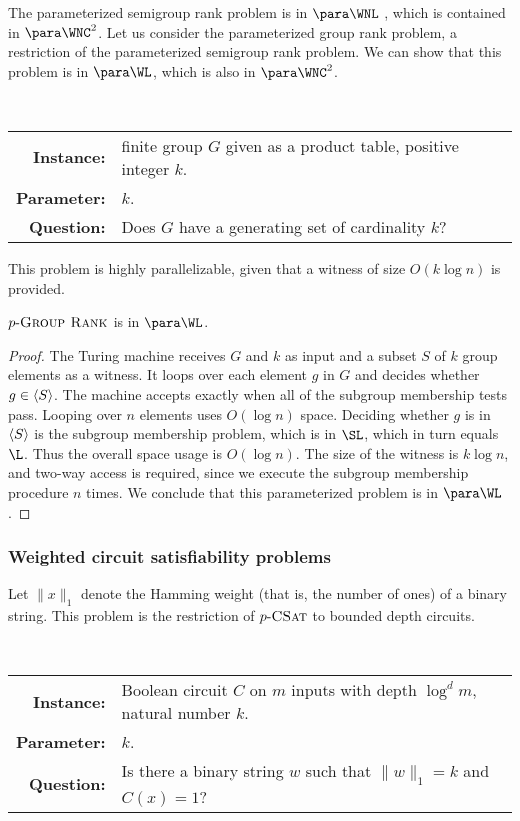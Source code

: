 The parameterized semigroup rank problem is in $\para \WNL$ \autocite[Theorem~3.12]{est15}, which is contained in $\para \WNC^2$.
Let us consider the parameterized group rank problem, a restriction of the parameterized semigroup rank problem.
We can show that this problem is in $\para \WL$, which is also in $\para \WNC^2$.

\begin{definition}[$\pgrouprank$]
  \mbox{} \\
  \begin{tabular}{r p{9.2cm}}
    \textbf{Instance:} & finite group $G$ given as a product table, positive integer $k$. \\
    \textbf{Parameter:} & $k$. \\
    \textbf{Question:} & Does $G$ have a generating set of cardinality $k$?
  \end{tabular}
\end{definition}

This problem is highly parallelizable, given that a witness of size $O(k \log n)$ is provided.

\begin{theorem}\label{thm:pgrouprank}
  $\pgrouprank$ is in $\para \WL$.
\end{theorem}
\begin{proof}
  The Turing machine receives $G$ and $k$ as input and a subset $S$ of $k$ group elements as a witness.
  It loops over each element $g$ in $G$ and decides whether $g \in \langle S\rangle$.
  The machine accepts exactly when all of the subgroup membership tests pass.
  Looping over $n$ elements uses $O(\log n)$ space.
  Deciding whether $g$ is in $\langle S\rangle$ is the subgroup membership problem, which is in $\SL$, which in turn equals $\L$.
  Thus the overall space usage is $O(\log n)$.
  The size of the witness is $k \log n$, and two-way access is required, since we execute the subgroup membership procedure $n$ times.
  We conclude that this parameterized problem is in $\para \WL$.
\end{proof}

\subsubsection{Weighted circuit satisfiability problems}

Let $\|x\|_1$ denote the Hamming weight (that is, the number of ones) of a binary string.
This problem is the restriction of $p \textnormal{-} \textsc{CSat}$ to bounded depth circuits.

\begin{definition}[$\pNCSAT$]
  \mbox{} \\
  \begin{tabular}{r p{9.2cm}}
    \textbf{Instance:} & Boolean circuit $C$ on $m$ inputs with depth $\log^d m$, natural number $k$. \\
    \textbf{Parameter:} & $k$. \\
    \textbf{Question:} & Is there a binary string $w$ such that $\|w\|_1 = k$ and $C(x) = 1$?
  \end{tabular}
\end{definition}

